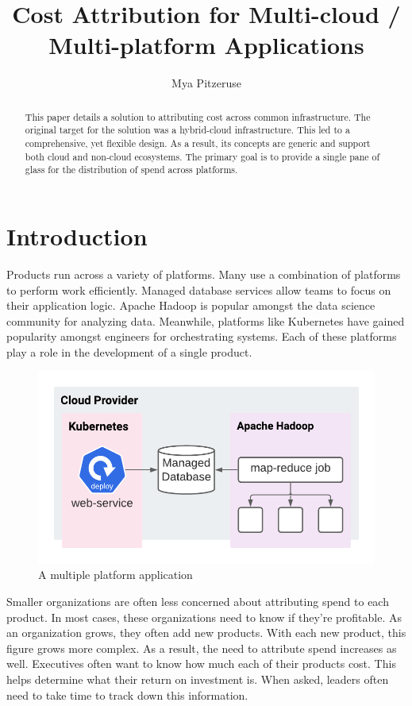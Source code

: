 \documentclass[10pt, a4paper, twocolumn]{article}
\title{Cost Attribution for Multi-cloud / Multi-platform Applications}
\author{Mya Pitzeruse}
\begin{document}
\maketitle

\begin{abstract}
  This paper details a solution to attributing cost across common infrastructure.
  The original target for the solution was a hybrid-cloud infrastructure.
  This led to a comprehensive, yet flexible design.
  As a result, its concepts are generic and support both cloud and non-cloud ecosystems.
  The primary goal is to provide a single pane of glass for the distribution of spend across platforms.
\end{abstract}


\section*{Introduction}
  Products run across a variety of platforms.
  Many use a combination of platforms to perform work efficiently.
  Managed database services allow teams to focus on their application logic.
  Apache Hadoop is popular amongst the data science community for analyzing data.
  Meanwhile, platforms like Kubernetes have gained popularity amongst engineers for orchestrating systems.
  Each of these platforms play a role in the development of a single product.

  \begin{figure}[H]
    \centering
    \includegraphics[width=\linewidth]{./cost-attribution-application.png}
    \caption{A multiple platform application}
    \label{figure:1}
  \end{figure}

  Smaller organizations are often less concerned about attributing spend to each product.
  In most cases, these organizations need to know if they're profitable.
  As an organization grows, they often add new products.
  With each new product, this figure grows more complex.
  As a result, the need to attribute spend increases as well.
  Executives often want to know how much each of their products cost.
  This helps determine what their return on investment is.
  When asked, leaders often need to take time to track down this information.
\end{document}
